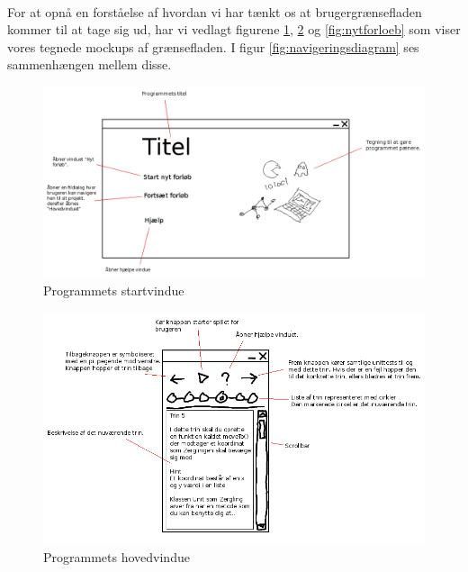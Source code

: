 \documentclass[10pt,a4paper,danish]{article}
\begin{document}
\paragraph{}
For at opnå en forståelse af hvordan vi har tænkt os at brugergrænsefladen 
kommer til at tage sig ud, har vi vedlagt figurene \ref{fig:startvindue}, 
\ref{fig:hovedvindue} og  \ref{fig:nytforloeb} som viser vores tegnede mockups
af grænsefladen. I figur \ref{fig:navigeringsdiagram} ses sammenhængen mellem disse.

\begin{figure}[h]
  \begin{center}
    \includegraphics[scale=0.4]{startvindue.png}
    \caption{Programmets startvindue}
    \label{fig:startvindue}
  \end{center}
\end{figure}
\newpage

\begin{figure}[h]
  \begin{center}
    \includegraphics[scale=0.5]{hovedvindue.png}
    \caption{Programmets hovedvindue}
    \label{fig:hovedvindue}
  \end{center}
\end{figure}
\newpage
\end{document}
